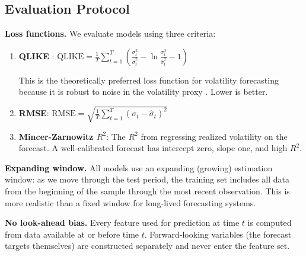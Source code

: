 \subsection{Evaluation Protocol}

\textbf{Loss functions.} We evaluate models using three criteria:

\begin{enumerate}[leftmargin=*]
    \item \textbf{QLIKE} \citep{Patton2011}: $\text{QLIKE} = \frac{1}{T}\sum_{t=1}^T \left(\frac{\sigma_t^2}{\hat{\sigma}_t^2} - \ln \frac{\sigma_t^2}{\hat{\sigma}_t^2} - 1\right)$

    This is the theoretically preferred loss function for volatility forecasting because it is robust to noise in the volatility proxy \citep{Patton2011}. Lower is better.

    \item \textbf{RMSE}: $\text{RMSE} = \sqrt{\frac{1}{T}\sum_{t=1}^T (\sigma_t - \hat{\sigma}_t)^2}$

    \item \textbf{Mincer-Zarnowitz $R^2$}: The $R^2$ from regressing realized volatility on the forecast. A well-calibrated forecast has intercept zero, slope one, and high $R^2$.
\end{enumerate}

\textbf{Expanding window.} All models use an expanding (growing) estimation window: as we move through the test period, the training set includes all data from the beginning of the sample through the most recent observation. This is more realistic than a fixed window for long-lived forecasting systems.

\textbf{No look-ahead bias.} Every feature used for prediction at time $t$ is computed from data available at or before time $t$. Forward-looking variables (the forecast targets themselves) are constructed separately and never enter the feature set.
